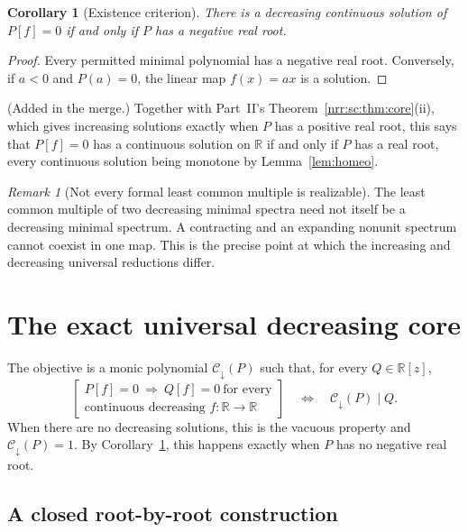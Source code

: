 \documentclass[11pt,letterpaper]{article}
\newtheorem{corollary}[theorem]{Corollary}
\theoremstyle{definition}
\theoremstyle{remark}
\newtheorem{remark}[theorem]{Remark}
\newcommand{\R}{\mathbb R}
\newcommand{\dcore}{\mathcal C_{\downarrow}}
\begin{document}
\begin{corollary}[Existence criterion]
\label{nrr:dc:cor:existence}
There is a decreasing continuous solution of $P[f]=0$ if and only if
$P$ has a negative real root.
\end{corollary}
\begin{proof}
Every permitted minimal polynomial has a negative real root. Conversely,
if $a<0$ and $P(a)=0$, the linear map $f(x)=ax$ is a solution.
\end{proof}

(Added in the merge.) Together with Part~II's
Theorem~\ref{nrr:sc:thm:core}(ii), which gives increasing solutions exactly
when $P$ has a positive real root, this says that $P[f]=0$ has a continuous
solution on $\R$ if and only if $P$ has a real root, every continuous
solution being monotone by Lemma~\ref{lem:homeo}.

\begin{remark}[Not every formal least common multiple is realizable]
The least common multiple of two decreasing minimal spectra need not
itself be a decreasing minimal spectrum. A contracting and an expanding
nonunit spectrum cannot coexist in one map. This is the precise point
at which the increasing and decreasing universal reductions differ.
\end{remark}

\section{The exact universal decreasing core}
\label{nrr:dc:sec:core}

The objective is a monic polynomial $\dcore(P)$ such that, for every
$Q\in\R[z]$,
\begin{equation}
 \left[
 \begin{array}{c}
 P[f]=0\ \Longrightarrow\ Q[f]=0\ \text{for every}\\[-2pt]
 \text{continuous decreasing }f:\R\to\R
 \end{array}\right]
 \quad\Longleftrightarrow\quad \dcore(P)\mid Q.
 \label{nrr:dc:eq:universal-property}
\end{equation}
When there are no decreasing solutions, this is the vacuous property
and $\dcore(P)=1$. By Corollary~\ref{nrr:dc:cor:existence}, this happens
exactly when $P$ has no negative real root.

\subsection{A closed root-by-root construction}
\end{document}
